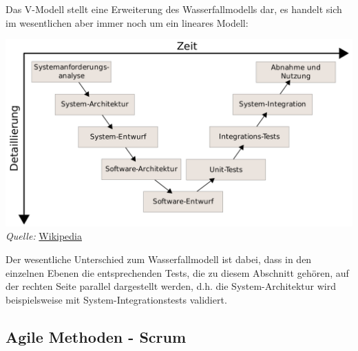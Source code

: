 \documentclass{article}
\begin{document}
Das V-Modell stellt eine Erweiterung des Wasserfallmodells dar, es handelt sich im wesentlichen aber immer noch um ein lineares Modell:
\begin{center}
    \includegraphics[scale=0.15]{../media/V-Modell.png} \\
    \textit{Quelle:} \href{https://de.wikipedia.org/wiki/V-Modell}{Wikipedia}
\end{center}
Der wesentliche Unterschied zum Wasserfallmodell ist dabei, dass in den einzelnen Ebenen die entsprechenden Tests, die zu diesem Abschnitt gehören, auf der rechten Seite parallel dargestellt werden, d.h. die System-Architektur wird beispielsweise mit System-Integrationstests validiert.

\subsection{Agile Methoden - Scrum}
\end{document}
